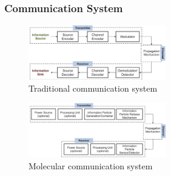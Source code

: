\documentclass[fontsize=11pt,aspectratio=169,t,fleqn]{beamer}
\begin{document}
\begin{frame}
    \frametitle{Communication System}
    \begin{figure}[H]
        \includegraphics[width=60mm,scale=2]{fig/TC_system.png}
        \caption{Traditional communication system}
    \end{figure}
    \begin{figure}[H]
        \includegraphics[width=60mm,scale=2]{fig/MC_system.png}
        \caption{Molecular communication system}
    \end{figure}
\end{frame}
\end{document}
